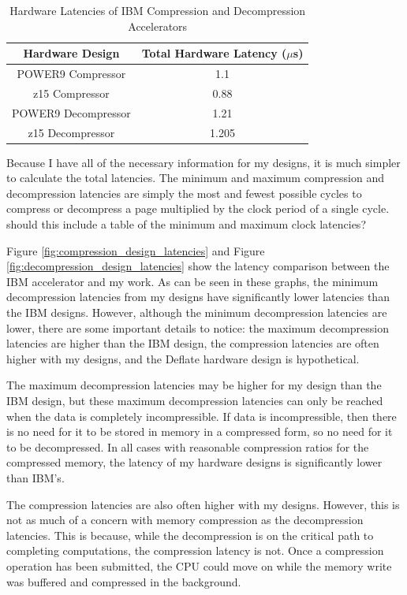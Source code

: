 \documentclass[doublespace,nopageskip]{VTthesis}
\begin{document}
\begin{table}[htb]
	\centering
	\caption{Hardware Latencies of IBM Compression and Decompression Accelerators}
	\begin{tabular}{cc}
	    \toprule
	    Hardware Design & Total Hardware Latency ($\mu$s) \\
		\midrule
		POWER9 Compressor & 1.1 \\
		\midrule
		z15 Compressor & 0.88 \\
		\midrule
		POWER9 Decompressor & 1.21 \\
		\midrule
		z15 Decompressor & 1.205 \\
		\bottomrule
	\end{tabular}
	\label{tab:ibm_latencies}
\end{table}

Because I have all of the necessary information for my designs, it is much simpler to calculate the total latencies. The minimum and maximum compression and decompression latencies are simply the most and fewest possible cycles to compress or decompress a page multiplied by the clock period of a single cycle. {\color{red} should this include a table of the minimum and maximum clock latencies?}

Figure \ref{fig:compression_design_latencies} and Figure \ref{fig:decompression_design_latencies} show the latency comparison between the IBM accelerator and my work. As can be seen in these graphs, the minimum decompression latencies from my designs have significantly lower latencies than the IBM designs. However, although the minimum decompression latencies are lower, there are some important details to notice: the maximum decompression latencies are higher than the IBM design, the compression latencies are often higher with my designs, and the Deflate hardware design is hypothetical.

The maximum decompression latencies may be higher for my design than the IBM design, but these maximum decompression latencies can only be reached when the data is completely incompressible. If data is incompressible, then there is no need for it to be stored in memory in a compressed form, so no need for it to be decompressed. In all cases with reasonable compression ratios for the compressed memory, the latency of my hardware designs is significantly lower than IBM's.

The compression latencies are also often higher with my designs. However, this is not as much of a concern with memory compression as the decompression latencies. This is because, while the decompression is on the critical path to completing computations, the compression latency is not. Once a compression operation has been submitted, the CPU could move on while the memory write was buffered and compressed in the background.
\end{document}

